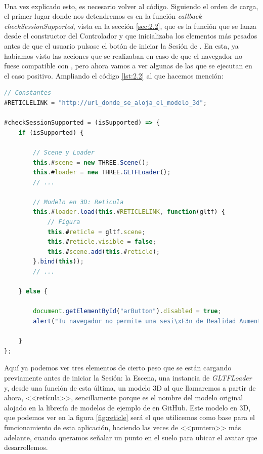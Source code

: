 \documentclass{subfiles}
\begin{document}
        \paragraph{}
        Una vez explicado esto, es necesario volver al código. Siguiendo el orden de carga, el primer lugar donde nos detendremos es en la función \textit{callback} \textit{checkSessionSupported}, vista en la sección \ref{sec:2.2}, que es la función que se lanza desde el constructor del Controlador y que inicializaba los elementos más pesados antes de que el usuario pulsase el botón de iniciar la Sesión de \ra. En esta, ya habíamos visto las acciones que se realizaban en caso de que el navegador no fuese compatible con \webxr, pero ahora vamos a ver algunas de las que se ejecutan en el caso positivo. Ampliando el código \ref{lst:2.2} al que hacemos mención:

\newpage
\begin{lstlisting}[language=JavaScript, caption={Carga de elementos de Three.js si se soporta la sesión.}, label={lst:3.1}]
// Constantes
#RETICLELINK = "http://url_donde_se_aloja_el_modelo_3d";

#checkSessionSupported = (isSupported) => {
    if (isSupported) {
    
        // Scene y Loader
        this.#scene = new THREE.Scene();
        this.#loader = new THREE.GLTFLoader();
        // ...

        // Modelo en 3D: Reticula
        this.#loader.load(this.#RETICLELINK, function(gltf) {
            // Figura
            this.#reticle = gltf.scene;
            this.#reticle.visible = false;
            this.#scene.add(this.#reticle);
        }.bind(this));
        // ...
    
    } else {
    
        document.getElementById("arButton").disabled = true;
        alert("Tu navegador no permite una sesi\xF3n de Realidad Aumentada.");
        
    }
};
\end{lstlisting}

        Aquí ya podemos ver tres elementos de cierto peso que se están cargando previamente antes de iniciar la Sesión: la Escena, una instancia de \textit{GLTFLoader} y, desde una función de esta última, un modelo 3D al que llamaremos a partir de ahora, <<retícula>>, sencillamente porque es el nombre del modelo original alojado en la librería de modelos de ejemplo de \webxr en GitHub. Este modelo en 3D, que podemos ver en la figura \ref{fig:reticle} será el que utilicemos como base para el funcionamiento de esta aplicación, haciendo las veces de <<puntero>> más adelante, cuando queramos señalar un punto en el suelo para ubicar el avatar que desarrollemos.
\end{document}
